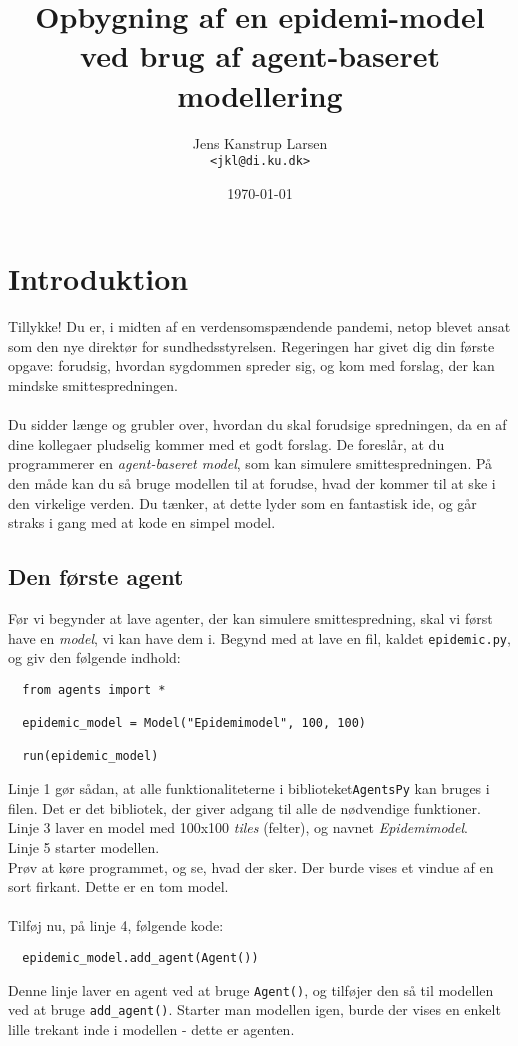 \documentclass{article}
\title{Opbygning af en epidemi-model\\
\large ved brug af agent-baseret modellering}
\author{Jens Kanstrup Larsen\\ \texttt{<jkl@di.ku.dk>}}
\date{\today}
\begin{document}
\maketitle

\section{Introduktion}
Tillykke! Du er, i midten af en verdensomspændende pandemi, netop blevet ansat som den nye direktør for sundhedsstyrelsen. Regeringen har givet dig din første opgave: forudsig, hvordan sygdommen spreder sig, og kom med forslag, der kan mindske smittespredningen.\\\\
Du sidder længe og grubler over, hvordan du skal forudsige spredningen, da en af dine kollegaer pludselig kommer med et godt forslag. De foreslår, at du programmerer en \textit{agent-baseret model}, som kan simulere smittespredningen. På den måde kan du så bruge modellen til at forudse, hvad der kommer til at ske i den virkelige verden. Du tænker, at dette lyder som en fantastisk ide, og går straks i gang med at kode en simpel model. 

\subsection{Den første agent}
Før vi begynder at lave agenter, der kan simulere smittespredning, skal vi først have en \textit{model}, vi kan have dem i. Begynd med at lave en fil, kaldet \texttt{epidemic.py}, og giv den følgende indhold:
\begin{lstlisting}
  from agents import *

  epidemic_model = Model("Epidemimodel", 100, 100)

  run(epidemic_model)
\end{lstlisting}
Linje 1 gør sådan, at alle funktionaliteterne i biblioteket\texttt{AgentsPy} kan bruges i filen. Det er det bibliotek, der giver adgang til alle de nødvendige funktioner.\\
Linje 3 laver en model med 100x100 \textit{tiles} (felter), og navnet \textit{Epidemimodel}.\\
Linje 5 starter modellen.\\
Prøv at køre programmet, og se, hvad der sker. Der burde vises et vindue af en sort firkant. Dette er en tom model.\\\\
Tilføj nu, på linje 4, følgende kode:
\begin{lstlisting}
  epidemic_model.add_agent(Agent())
\end{lstlisting}
Denne linje laver en agent ved at bruge \texttt{Agent()}, og tilføjer den så til modellen ved at bruge \texttt{add\_agent()}. Starter man modellen igen, burde der vises en enkelt lille trekant inde i modellen - dette er agenten.
\end{document}
